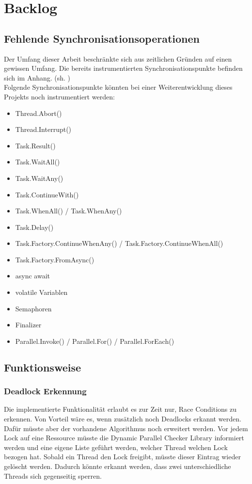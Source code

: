 \documentclass[10pt,a4paper]{article}
\begin{document}
\section{Backlog}
\subsection{Fehlende Synchronisationsoperationen}
\begin{flushleft}
Der Umfang dieser Arbeit beschränkte sich aus zeitlichen Gründen auf einen gewissen Umfang. Die bereits instrumentierten Synchronisationspunkte befinden sich im Anhang. (sh. )\\
Folgende Synchronisationspunkte könnten bei einer Weiterentwicklung dieses Projekts noch instrumentiert werden:
\begin{itemize}
\setlength\itemsep{0em}
\item Thread.Abort()
\item Thread.Interrupt()
\item Task.Result()
\item Task.WaitAll()
\item Task.WaitAny()
\item Task.ContinueWith()
\item Task.WhenAll() / Task.WhenAny()
\item Task.Delay()
\item Task.Factory.ContinueWhenAny() / Task.Factory.ContinueWhenAll()
\item Task.Factory.FromAsync()
\item async await
\item volatile Variablen
\item Semaphoren
\item Finalizer
\item Parallel.Invoke() / Parallel.For() / Parallel.ForEach()
\end{itemize}
\end{flushleft}
\subsection{Funktionsweise}
\subsubsection*{Deadlock Erkennung}
\begin{flushleft}
Die implementierte Funktionalität erlaubt es zur Zeit nur, Race Conditions zu erkennen. Von Vorteil wäre es, wenn zusätzlich noch Deadlocks erkannt werden. Dafür müsste aber der vorhandene Algorithmus noch erweitert werden. Vor jedem Lock auf eine Ressource müsste die Dynamic Parallel Checker Library informiert werden und eine eigene Liste geführt werden, welcher Thread welchen Lock bezogen hat. Sobald ein Thread den Lock freigibt, müsste dieser Eintrag wieder gelöscht werden. Dadurch könnte erkannt werden, dass zwei unterschiedliche Threads sich gegenseitig sperren.
\end{flushleft}
\end{document}
